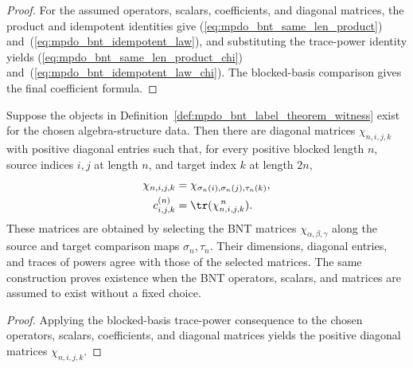 \begin{proof}\leanok
    For the assumed operators, scalars, coefficients, and diagonal matrices,
    the product and idempotent identities give
    (\ref{eq:mpdo_bnt_same_len_product})
    and~(\ref{eq:mpdo_bnt_idempotent_law}), and substituting the trace-power
    identity yields
    (\ref{eq:mpdo_bnt_same_len_product_chi})
    and~(\ref{eq:mpdo_bnt_idempotent_law_chi}).
    The blocked-basis comparison gives the final coefficient formula.
\end{proof}

\begin{lemma}%
    \label{thm:mpdo_bnt_label_theorem_witness_to_positive_blocked_chi_trace_power_form}
    \leanok
    Suppose the objects in
    Definition~\ref{def:mpdo_bnt_label_theorem_witness} exist for the
    chosen algebra-structure data. Then there are diagonal matrices
    $\chi_{n,i,j,k}$ with positive diagonal entries such that, for every
    positive blocked length $n$, source indices $i,j$ at length $n$,
    and target index $k$ at length $2n$,
    \begin{align}
        \chi_{n,i,j,k}
         & = \chi_{\sigma_n(i),\sigma_n(j),\tau_n(k)},
        \notag                                         \\
        c^{(n)}_{i,j,k}
         & = \tr(\chi_{n,i,j,k}^{\,n}).
        \notag
    \end{align}
    These matrices are obtained by selecting the BNT matrices
    $\chi_{\alpha,\beta,\gamma}$ along the source and target comparison
    maps $\sigma_n,\tau_n$. Their dimensions, diagonal entries, and
    traces of powers agree with those of the selected matrices.
    The same construction proves existence when the BNT operators,
    scalars, and matrices are assumed to exist without a fixed choice.
\end{lemma}
\begin{proof}\leanok
    Applying the blocked-basis trace-power consequence to the chosen
    operators, scalars, coefficients, and diagonal matrices yields the
    positive diagonal matrices $\chi_{n,i,j,k}$.
\end{proof}

